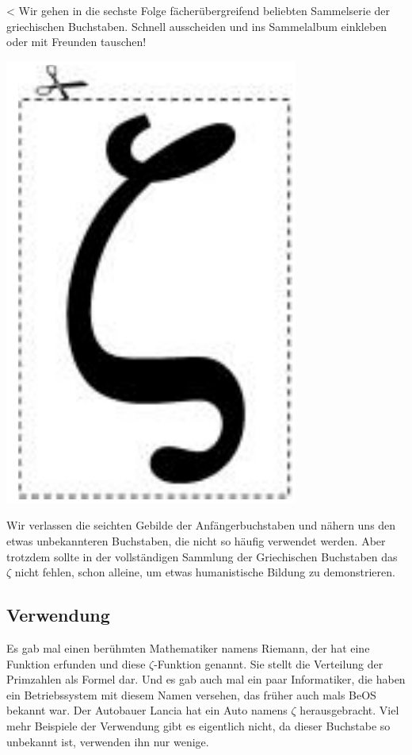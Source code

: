<
{Wir gehen in die sechste Folge fächerübergreifend beliebten Sammelserie der griechischen Buchstaben.
Schnell ausscheiden und ins Sammelalbum einkleben oder mit Freunden tauschen!}
{\vspace*{-1.5\baselineskip}\begin{center} 
	\includegraphics[scale=0.4]{grafik/zeta.png}
\end{center}
\flushleft
Wir verlassen die seichten Gebilde der Anfängerbuchstaben und 
nähern uns den etwas unbekannteren Buchstaben, die nicht so
häufig verwendet werden. Aber trotzdem sollte in der vollständigen
Sammlung der Griechischen Buchstaben das $\zeta$ nicht fehlen,
schon alleine, um etwas humanistische Bildung zu demonstrieren.

\subsection*{Verwendung}

Es gab mal einen berühmten Mathematiker namens Riemann, der hat eine Funktion
erfunden und diese $\zeta$-Funktion genannt. Sie stellt die Verteilung
der Primzahlen als Formel dar. Und es gab auch mal ein paar Informatiker, die
haben ein Betriebssystem mit diesem Namen versehen, das früher auch mals BeOS
bekannt war.
Der Autobauer Lancia hat ein Auto namens $\zeta$ herausgebracht.
Viel mehr Beispiele der Verwendung gibt es eigentlich nicht, da dieser
Buchstabe so unbekannt ist, verwenden ihn nur wenige.

}
